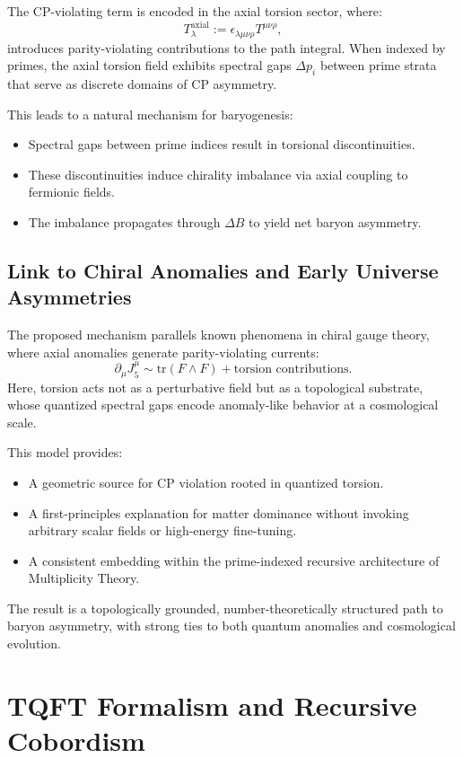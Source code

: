 \documentclass{article}
\theoremstyle{plain}
\begin{document}
The CP-violating term is encoded in the axial torsion sector, where:
\[
T^{\text{axial}}_{\lambda} := \epsilon_{\lambda\mu\nu\rho} T^{\mu\nu\rho},
\]
introduces parity-violating contributions to the path integral. When indexed by primes, the axial torsion field exhibits spectral gaps $\Delta p_i$ between prime strata that serve as discrete domains of CP asymmetry.

This leads to a natural mechanism for baryogenesis:
\begin{itemize}
    \item Spectral gaps between prime indices result in torsional discontinuities.
    \item These discontinuities induce chirality imbalance via axial coupling to fermionic fields.
    \item The imbalance propagates through $\Delta B$ to yield net baryon asymmetry.
\end{itemize}

\subsection{Link to Chiral Anomalies and Early Universe Asymmetries}

The proposed mechanism parallels known phenomena in chiral gauge theory, where axial anomalies generate parity-violating currents:
\[
\partial_\mu J^\mu_5 \sim \text{tr}(F \wedge F) + \text{torsion contributions}.
\]
Here, torsion acts not as a perturbative field but as a topological substrate, whose quantized spectral gaps encode anomaly-like behavior at a cosmological scale.

This model provides:
\begin{itemize}
    \item A geometric source for CP violation rooted in quantized torsion.
    \item A first-principles explanation for matter dominance without invoking arbitrary scalar fields or high-energy fine-tuning.
    \item A consistent embedding within the prime-indexed recursive architecture of Multiplicity Theory.
\end{itemize}

The result is a topologically grounded, number-theoretically structured path to baryon asymmetry, with strong ties to both quantum anomalies and cosmological evolution.

\section{TQFT Formalism and Recursive Cobordism}
\end{document}
